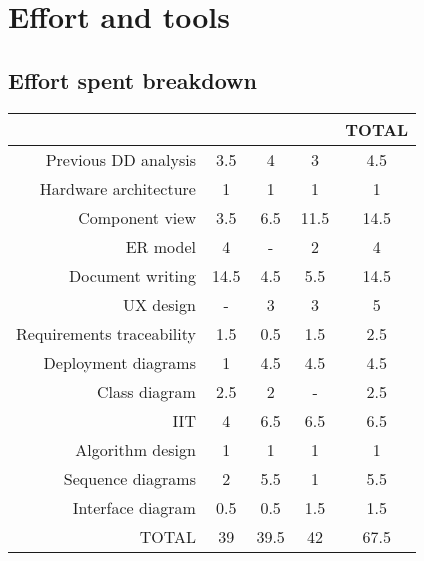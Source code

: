 
\section{Effort and tools}
\label{sect:effort}

\subsection{Effort spent breakdown}
\begin{center}
	\setlength{\arrayrulewidth}{0.5mm}
	\begin{tabular}[width=\textwidth]{r | c c c | c}
		                          & 			  & 			   & 				& TOTAL \\ \hline
		Previous DD analysis      & 3.5           & 4              & 3              & 4.5   \\
		Hardware architecture     & 1             & 1              & 1              & 1     \\
		Component view            & 3.5           & 6.5            & 11.5           & 14.5  \\
		ER model                  & 4             & -              & 2              & 4     \\
		Document writing          & 14.5          & 4.5            & 5.5            & 14.5  \\
		UX design                 & -             & 3              & 3              & 5     \\
		Requirements traceability & 1.5           & 0.5            & 1.5            & 2.5   \\
		Deployment diagrams       & 1             & 4.5            & 4.5            & 4.5   \\
		Class diagram             & 2.5           & 2              & -              & 2.5   \\
		IIT	 					  & 4             & 6.5            & 6.5            & 6.5   \\
		Algorithm design          & 1             & 1              & 1              & 1     \\
		Sequence diagrams         & 2             & 5.5            & 1              & 5.5   \\
		Interface diagram         & 0.5           & 0.5            & 1.5            & 1.5   \\ \hline
		TOTAL                     & 39            & 39.5           & 42             & 67.5 
	\end{tabular}
\end{center}

